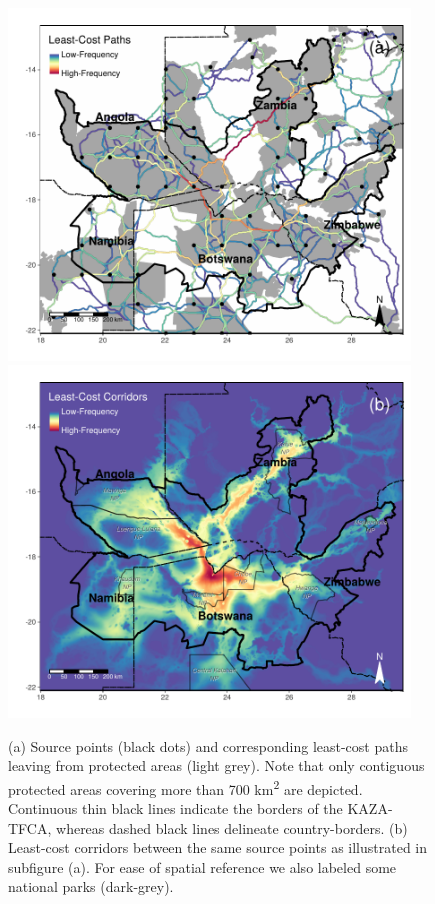 \documentclass[abstract=on,10pt,a4paper,bibliography=totocnumbered]{article}
\begin{document}
\begin{figure}[hbtp]
  \begin{center}
    \begin{minipage}{0.95\textwidth}
      \includegraphics[width = 0.95\textwidth]{99_LeastCostPaths.pdf}
      \includegraphics[width = 0.95\textwidth]{99_LeastCostCorrs.pdf}
    \end{minipage}
    \caption{(a) Source points (black dots) and corresponding least-cost paths
    leaving from protected areas (light grey). Note that only contiguous
    protected areas covering more than 700 km\textsuperscript{2} are depicted.
    Continuous thin black lines indicate the borders of the KAZA-TFCA, whereas
    dashed black lines delineate country-borders. (b) Least-cost corridors
    between the same source points as illustrated in subfigure (a). For ease of
    spatial reference we also labeled some national parks (dark-grey).}
    \label{LeastCost}
  \end{center}
\end{figure}
\end{document}

